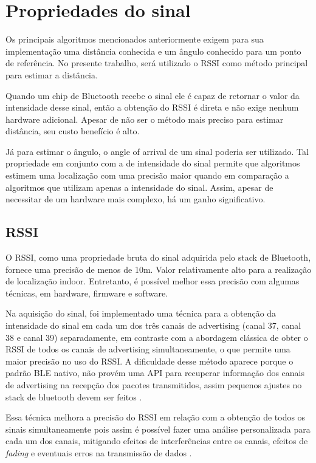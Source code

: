 \section{Propriedades do sinal}
Os principais algoritmos mencionados anteriormente exigem para sua implementação uma distância conhecida e um ângulo conhecido para um ponto de referência. No presente trabalho, será utilizado o RSSI como método principal para estimar a distância. %

Quando um chip de Bluetooth recebe o sinal ele é capaz de retornar o valor da intensidade desse sinal, então a obtenção do RSSI é direta e não exige nenhum hardware adicional. Apesar de não ser o método mais preciso para estimar distância, seu custo benefício é alto.

Já para estimar o ângulo, o angle of arrival de um sinal poderia ser utilizado. Tal propriedade em conjunto com a de intensidade do sinal permite que algoritmos estimem uma localização com uma precisão maior quando em comparação a algoritmos que utilizam apenas a intensidade do sinal. Assim, apesar de necessitar de um hardware mais complexo, há um ganho significativo.

\subsection{RSSI}
O RSSI, como uma propriedade bruta do sinal adquirida pelo stack de Bluetooth, fornece uma precisão de menos de 10m. Valor relativamente alto para a realização de localização indoor. Entretanto, é possível melhor essa precisão com algumas técnicas, em hardware, firmware e software.

Na aquisição do sinal, foi implementado uma técnica para a obtenção da intensidade do sinal em cada um dos três canais de advertising (canal 37, canal 38 e canal 39) separadamente, em contraste com a abordagem clássica de obter o RSSI de todos os canais de advertising simultaneamente, o que permite uma maior precisão no uso do RSSI. A dificuldade desse método aparece porque o padrão BLE nativo, não provém uma API para recuperar informação dos canais de advertising na recepção dos pacotes transmitidos, assim pequenos ajustes no stack de bluetooth devem ser feitos \cite{art16}.

Essa técnica melhora a precisão do RSSI em relação com a obtenção de todos os sinais simultaneamente pois assim é possível fazer uma análise personalizada para cada um dos canais, mitigando efeitos de interferências entre os canais, efeitos de \textit {fading} e eventuais erros na transmissão de dados \cite{art17}.

